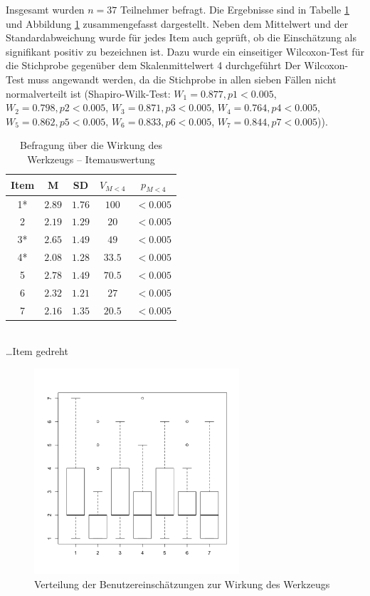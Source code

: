 Insgesamt wurden $n=37$ Teilnehmer befragt. Die Ergebnisse sind in Tabelle \ref{tab:behinderung} und Abbildung \ref{fig:img_Evaluierung_behinderung} zusammengefasst dargestellt. Neben dem Mittelwert und der Standardabweichung wurde für jedes Item auch geprüft, ob die Einschätzung als signifikant positiv zu bezeichnen ist. Dazu wurde ein einseitiger Wilcoxon-Test für die Stichprobe gegenüber dem Skalenmittelwert 4 durchgeführt {Der Wilcoxon-Test muss angewandt werden, da die Stichprobe in allen sieben Fällen nicht normalverteilt ist (Shapiro-Wilk-Test: $W_{1}=0.877, p{1}<0.005$, $W_{2}=0.798, p{2}<0.005$, $W_{3}=0.871, p{3}<0.005$, $W_{4}=0.764, p{4}<0.005$, $W_{5}=0.862, p{5}<0.005$, $W_{6}=0.833, p{6}<0.005$, $W_{7}=0.844, p{7}<0.005$)}).

\begin{table}[htbp]
	\centering
	\caption{Befragung über die Wirkung des Werkzeugs -- Itemauswertung}

\begin{tabular}{| c || c | c || c | c |}
  \hline
   Item & M & SD & $V_{M<4}$ & $p_{M<4}$ \\ \hline
   1* & $2.89$ & $1.76$ & $100$ & $<0.005$ \\ 
   2  & $2.19$ & $1.29$ & $20$ & $<0.005$ \\ 
   3* & $2.65$ & $1.49$ & $49$ & $<0.005$ \\ 
   4* & $2.08$ & $1.28$ & $33.5$ & $<0.005$ \\ 
   5  & $2.78$ & $1.49$ & $70.5$ & $<0.005$ \\ 
   6  & $2.32$ & $1.21$ & $27$ & $<0.005$ \\ 
   7  & $2.16$ & $1.35$ & $20.5$ & $<0.005$ \\ \hline
\end{tabular} \\ 
	\footnotesize * \ldots Item gedreht
	\label{tab:behinderung}
\end{table}

\begin{figure}[htbp]
	\centering
		\includegraphics[height=3in]{img/Evaluierung/behinderung.png}
	\caption{Verteilung der Benutzereinschätzungen zur Wirkung des Werkzeugs}
	\label{fig:img_Evaluierung_behinderung}
\end{figure}

